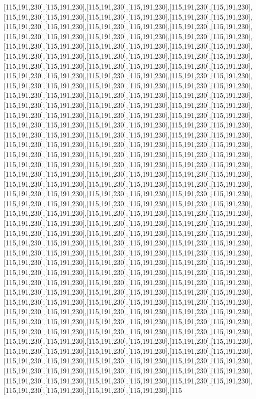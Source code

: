 [115,191,230],[115,191,230],[115,191,230],[115,191,230],[115,191,230],[115,191,230],[115,191,230],[115,191,230],[115,191,230],[115,191,230],[115,191,230],[115,191,230],[115,191,230],[115,191,230],[115,191,230],[115,191,230],[115,191,230],[115,191,230],[115,191,230],[115,191,230],[115,191,230],[115,191,230],[115,191,230],[115,191,230],[115,191,230],[115,191,230],[115,191,230],[115,191,230],[115,191,230],[115,191,230],[115,191,230],[115,191,230],[115,191,230],[115,191,230],[115,191,230],[115,191,230],[115,191,230],[115,191,230],[115,191,230],[115,191,230],[115,191,230],[115,191,230],[115,191,230],[115,191,230],[115,191,230],[115,191,230],[115,191,230],[115,191,230],[115,191,230],[115,191,230],[115,191,230],[115,191,230],[115,191,230],[115,191,230],[115,191,230],[115,191,230],[115,191,230],[115,191,230],[115,191,230],[115,191,230],[115,191,230],[115,191,230],[115,191,230],[115,191,230],[115,191,230],[115,191,230],[115,191,230],[115,191,230],[115,191,230],[115,191,230],[115,191,230],[115,191,230],[115,191,230],[115,191,230],[115,191,230],[115,191,230],[115,191,230],[115,191,230],[115,191,230],[115,191,230],[115,191,230],[115,191,230],[115,191,230],[115,191,230],[115,191,230],[115,191,230],[115,191,230],[115,191,230],[115,191,230],[115,191,230],[115,191,230],[115,191,230],[115,191,230],[115,191,230],[115,191,230],[115,191,230],[115,191,230],[115,191,230],[115,191,230],[115,191,230],[115,191,230],[115,191,230],[115,191,230],[115,191,230],[115,191,230],[115,191,230],[115,191,230],[115,191,230],[115,191,230],[115,191,230],[115,191,230],[115,191,230],[115,191,230],[115,191,230],[115,191,230],[115,191,230],[115,191,230],[115,191,230],[115,191,230],[115,191,230],[115,191,230],[115,191,230],[115,191,230],[115,191,230],[115,191,230],[115,191,230],[115,191,230],[115,191,230],[115,191,230],[115,191,230],[115,191,230],[115,191,230],[115,191,230],[115,191,230],[115,191,230],[115,191,230],[115,191,230],[115,191,230],[115,191,230],[115,191,230],[115,191,230],[115,191,230],[115,191,230],[115,191,230],[115,191,230],[115,191,230],[115,191,230],[115,191,230],[115,191,230],[115,191,230],[115,191,230],[115,191,230],[115,191,230],[115,191,230],[115,191,230],[115,191,230],[115,191,230],[115,191,230],[115,191,230],[115,191,230],[115,191,230],[115,191,230],[115,191,230],[115,191,230],[115,191,230],[115,191,230],[115,191,230],[115,191,230],[115,191,230],[115,191,230],[115,191,230],[115,191,230],[115,191,230],[115,191,230],[115,191,230],[115,191,230],[115,191,230],[115,191,230],[115,191,230],[115,191,230],[115,191,230],[115,191,230],[115,191,230],[115,191,230],[115,191,230],[115,191,230],[115,191,230],[115,191,230],[115,191,230],[115,191,230],[115,191,230],[115,191,230],[115,191,230],[115,191,230],[115,191,230],[115,191,230],[115,191,230],[115,191,230],[115,191,230],[115,191,230],[115,191,230],[115,191,230],[115,191,230],[115,191,230],[115,191,230],[115,191,230],[115,191,230],[115,191,230],[115,191,230],[115,191,230],[115,191,230],[115,191,230],[115,191,230],[115,191,230],[115,191,230],[115,191,230],[115,191,230],[115,191,230],[115,191,230],[115,191,230],[115,191,230],[115,191,230],[115,191,230],[115,191,230],[115,191,230],[115,191,230],[115,191,230],[115,191,230],[115,191,230],[115,191,230],[115,191,230],[115,191,230],[115,191,230],[115,191,230],[115,191,230],[115,191,230],[115,191,230],[115,191,230],[115